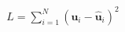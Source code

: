\documentclass[preview]{standalone}
\begin{document}
\begin{align*}
L = \sum_{i=1}^N \left(\mathbf{u}_i - \hat{\mathbf{u}}_i\right)^2
\end{align*}
\end{document}
